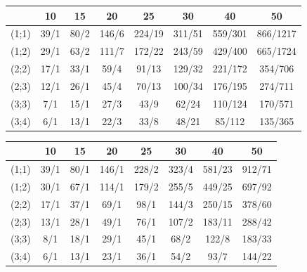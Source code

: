 \documentclass[12pt,a4paper]{article}
\begin{document}
\begin{center}
\begin{tabular}{|c|c|c|c|c|c|c|c|}
\hline
&10 & 15 & 20 & 25 & 30 & 40 & 50\\
\hline 
(1;1) & 39/1 & 80/2 & 146/6 & 224/19 & 311/51 & 559/301 & 866/1217 \\ 
\hline 
(1;2) & 29/1 & 63/2 & 111/7 & 172/22 & 243/59 & 429/400 & 665/1724 \\ 
\hline 
(2;2) & 17/1 & 33/1 & 59/4 & 91/13 & 129/32 & 221/172 & 354/706 \\ 
\hline 
(2;3) & 12/1 & 26/1 & 45/4& 70/13 & 100/34 & 176/195 & 274/711 \\ 
\hline 
(3;3) & 7/1 & 15/1 & 27/3 & 43/9 & 62/24 & 110/124 & 170/571 \\ 
\hline 
(3;4) & 6/1 & 13/1 & 22/3 & 33/8 & 48/21 & 85/112 & 135/365 \\ 
\hline 
\end{tabular} 

\begin{tabular}{|c|c|c|c|c|c|c|c|}
\hline
&10 & 15 & 20 & 25 & 30 & 40 & 50\\
\hline 
(1;1) & 39/1 & 80/1 & 146/1 & 228/2 & 323/4 & 581/23 & 912/71 \\ 
\hline 
(1;2) & 30/1 & 67/1 & 114/1 & 179/2 & 255/5 & 449/25 & 697/92 \\ 
\hline 
(2;2) & 17/1 & 37/1 & 69/1 & 98/1 & 144/3 & 250/15 & 378/60 \\ 
\hline 
(2;3) & 13/1 & 28/1 & 49/1& 76/1 & 107/2 & 183/11 & 288/42 \\ 
\hline 
(3;3) & 8/1 & 18/1 & 29/1 & 45/1 & 68/2 & 122/8 & 183/33 \\ 
\hline 
(3;4) & 6/1 & 13/1 & 23/1 & 36/1 & 54/2 & 93/7 & 144/22 \\ 
\hline 
\end{tabular}
\end{center} 
\end{document}
